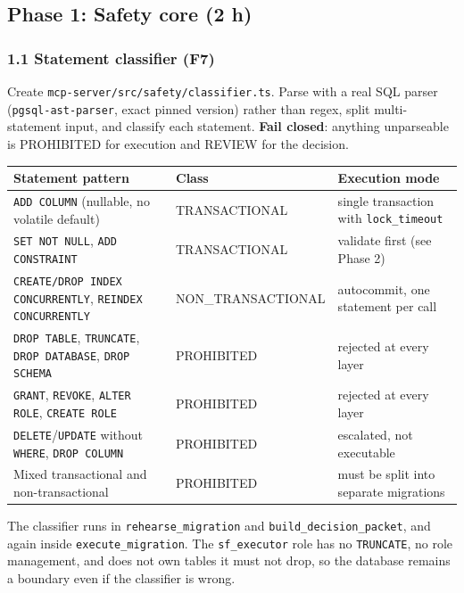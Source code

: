 \documentclass[11pt,a4paper]{article}
\newcommand{\fp}[1]{\nolinkurl{#1}}  %
\begin{document}
\subsection{Phase 1: Safety core (2 h)}
\label{sec:p1}

\subsubsection*{1.1 Statement classifier (F7)}
Create \fp{mcp-server/src/safety/classifier.ts}. Parse with a real SQL parser
(\fp{pgsql-ast-parser}, exact pinned version) rather than regex, split multi-statement
input, and classify each statement. \textbf{Fail closed}: anything unparseable is
PROHIBITED for execution and REVIEW for the decision.

\begin{longtable}{@{}L{6.2cm}L{3.8cm}L{5.0cm}@{}}
\toprule
\sffamily\bfseries Statement pattern & \sffamily\bfseries Class & \sffamily\bfseries Execution mode \\
\midrule
\texttt{ADD COLUMN} (nullable, no volatile default) & TRANSACTIONAL & single transaction with \fp{lock_timeout} \\
\texttt{SET NOT NULL}, \texttt{ADD CONSTRAINT} & TRANSACTIONAL & validate first (see Phase 2) \\
\texttt{CREATE/DROP INDEX CONCURRENTLY}, \texttt{REINDEX CONCURRENTLY} & NON\_\allowbreak TRANSACTIONAL & autocommit, one statement per call \\
\texttt{DROP TABLE}, \texttt{TRUNCATE}, \texttt{DROP DATABASE}, \texttt{DROP SCHEMA} & PROHIBITED & rejected at every layer \\
\texttt{GRANT}, \texttt{REVOKE}, \texttt{ALTER ROLE}, \texttt{CREATE ROLE} & PROHIBITED & rejected at every layer \\
\texttt{DELETE}/\texttt{UPDATE} without \texttt{WHERE}, \texttt{DROP COLUMN} & PROHIBITED & escalated, not executable \\
Mixed transactional and non-transactional & PROHIBITED & must be split into separate migrations \\
\bottomrule
\end{longtable}

The classifier runs in \fp{rehearse_migration} and \fp{build_decision_packet}, and again inside
\fp{execute_migration}. The \fp{sf_executor} role has no \texttt{TRUNCATE}, no role
management, and does not own tables it must not drop, so the database remains a boundary
even if the classifier is wrong.
\end{document}
